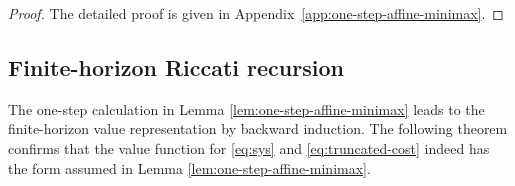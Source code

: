 \documentclass[10pt,journal,twoside]{IEEEtran}
\theoremstyle{definition}
\theoremstyle{remark}
\begin{document}
\begin{proof}
	The detailed proof is given in
	Appendix~\ref{app:one-step-affine-minimax}.
\end{proof}

    




\subsection{Finite-horizon Riccati recursion}
\label{subsec:finite-horizon-synthesis}











The one-step calculation in Lemma \ref{lem:one-step-affine-minimax} leads to the finite-horizon value representation by backward induction. The following theorem confirms that the value function for \eqref{eq:sys} and \eqref{eq:truncated-cost} indeed has the form assumed in Lemma \ref{lem:one-step-affine-minimax}. 
\end{document}
